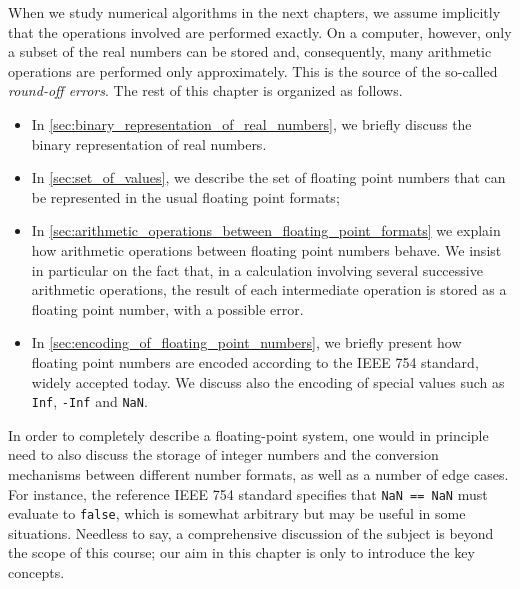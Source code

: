 When we study numerical algorithms in the next chapters,
we assume implicitly that the operations involved are performed exactly.
On a computer, however, only a subset of the real numbers can be stored and,
consequently, many arithmetic operations are performed only approximately.
This is the source of the so-called \emph{round-off errors}.
The rest of this chapter is organized as follows.
\begin{itemize}
    \item
        In \cref{sec:binary_representation_of_real_numbers},
        we briefly discuss the binary representation of real numbers.
    \item
        In \cref{sec:set_of_values},
        we describe the set of floating point numbers that can be represented in the usual floating point formats;
    \item
        In \cref{sec:arithmetic_operations_between_floating_point_formats}
        we explain how arithmetic operations between floating point numbers behave.
        We insist in particular on the fact that,
        in a calculation involving several successive arithmetic operations,
        the result of each intermediate operation is stored as a floating point number,
        with a possible error.
    \item
        In \cref{sec:encoding_of_floating_point_numbers},
        we briefly present how floating point numbers are encoded
        according to the IEEE 754 standard, widely accepted today.
        We discuss also the encoding of special values such as \texttt{Inf}, \texttt{-Inf} and \texttt{NaN}.
\end{itemize}
In order to completely describe a floating-point system,
one would in principle need to also discuss the storage of integer numbers
and the conversion mechanisms between different number formats,
as well as a number of edge cases.
For instance, the reference IEEE 754 standard specifies that \texttt{NaN == NaN} must evaluate to \texttt{false},
which is somewhat arbitrary but may be useful in some situations.
Needless to say,
a comprehensive discussion of the subject is beyond the scope of this course;
our aim in this chapter is only to introduce the key concepts.

